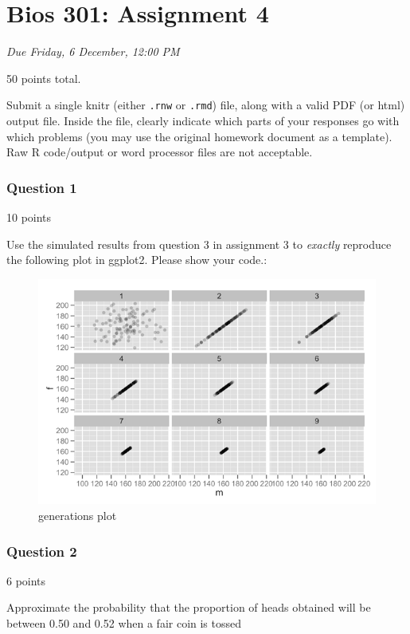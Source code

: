 \documentclass[]{article}
\author{}
\date{}
\makeatletter
\def\maxwidth{\ifdim\Gin@nat@width>\linewidth\linewidth
\else\Gin@nat@width\fi}
\let\Oldincludegraphics\includegraphics
\renewcommand{\includegraphics}[1]{\Oldincludegraphics[width=\maxwidth]{#1}}
\makeatother
\begin{document}
\section{Bios 301: Assignment 4}

\emph{Due Friday, 6 December, 12:00 PM}

50 points total.

Submit a single knitr (either \texttt{.rnw} or \texttt{.rmd}) file,
along with a valid PDF (or html) output file. Inside the file, clearly
indicate which parts of your responses go with which problems (you may
use the original homework document as a template). Raw R code/output or
word processor files are not acceptable.

\subsubsection{Question 1}

10 points

Use the simulated results from question 3 in assignment 3 to
\emph{exactly} reproduce the following plot in ggplot2. Please show your
code.:

\begin{figure}[htbp]
\centering
\includegraphics{a4q1.png}
\caption{generations plot}
\end{figure}

\subsubsection{Question 2}

6 points

Approximate the probability that the proportion of heads obtained will
be between 0.50 and 0.52 when a fair coin is tossed
\end{document}
